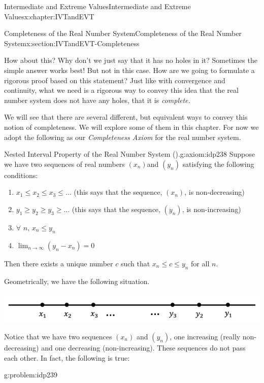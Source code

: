 \begin{chapterptx}{Intermediate and Extreme Values}{}{Intermediate and Extreme Values}{}{}{x:chapter:IVTandEVT}
\begin{sectionptx}{Completeness of the Real Number System}{}{Completeness of the Real Number System}{}{}{x:section:IVTandEVT-Completeness}
		\par
		How about this? Why don't we just say that it has no holes in it? Sometimes the simple answer works best! But not in this case. How are we going to formulate a rigorous proof based on this statement? Just like with convergence and continuity, what we need is a rigorous way to convey this idea that the real number system does not have any holes, that it is \emph{complete.}%
		\par
		We will see that there are several different, but equivalent ways to convey this notion of completeness. We will explore some of them in this chapter. For now we adopt the following as our \emph{Completeness Axiom} for the real number system.%
		\begin{axiom}{Nested Interval Property of the Real Number System ().}{}{g:axiom:idp238}%
			Suppose we have two sequences of real numbers \(\left(x_n\right)\)and \(\left(y_n\right)\) satisfying the following conditions:%
			\par
			\begin{enumerate}
				\item{}\(x_1\leq x_2\leq x_3\leq\ldots\) (this says that the sequence, \(\left(x_n\right)\), is non-decreasing)%
				\item{}\(y_1\geq y_2\geq y_3\geq\ldots\) (this says that the sequence, \(\left(y_n\right)\), is non-increasing) %
				\item{}\(\forall\) \(n\), \(x_n\leq y_n\)%
				\item{}\(\displaystyle \lim_{n\rightarrow\infty}\left(y_n-x_n\right)=0\)%
			\end{enumerate}
			\par
			Then there exists a unique number \(c\) such that \(x_n\leq
			c\leq y_n\) for all \(n\).%
		\end{axiom}
		Geometrically, we have the following situation.%
		\begin{image}{0.125}{0.75}{0.125}%
			\includegraphics[width=\linewidth]{external/images/Ch6fig3.png}
		\end{image}%
		Notice that we have two sequences \(\left(x_n\right)\) and \(\left(y_n\right)\), one increasing (really non-decreasing) and one decreasing (non-increasing). These sequences do not pass each other. In fact, the following is true:%
		\begin{problem}{}{g:problem:idp239}%

\end{problem}
\end{sectionptx}
\end{chapterptx}
